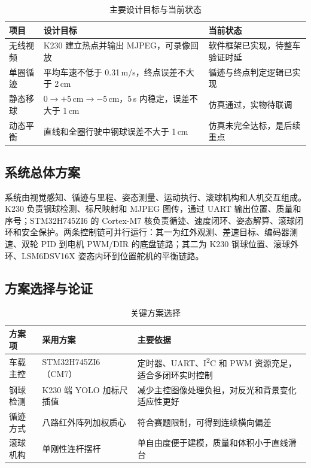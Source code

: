 \documentclass[UTF8,a4paper,12pt]{ctexart}
\begin{document}
\begin{table}[H]
  \centering
  \caption{主要设计目标与当前状态}
  \label{tab:targets}
  \begin{tabularx}{\textwidth}{>{\raggedright\arraybackslash}p{}X>{\raggedright\arraybackslash}p{}}
    \toprule
    项目 & 设计目标 & 当前状态 \\
    \midrule
    无线视频 & K230 建立热点并输出 MJPEG，可录像回放 & 软件框架已实现，待整车验证时延 \\
    单圈循迹 & 平均车速不低于 0.31\,m/s，终点误差不大于 2\,cm & 循迹与终点判定逻辑已实现 \\
    静态移球 & $0\rightarrow+5\,\mathrm{cm}\rightarrow-5\,\mathrm{cm}$，5\,s 内稳定，误差不大于 1\,cm & 仿真通过，实物待联调 \\
    动态平衡 & 直线和全圈行驶中钢球误差不大于 1\,cm & 仿真未完全达标，是后续重点 \\
    \bottomrule
  \end{tabularx}
\end{table}

\subsection{系统总体方案}

系统由视觉感知、循迹与里程、姿态测量、运动执行、滚球机构和人机交互组成。K230 负责钢球检测、标尺映射和 MJPEG 图传，通过 UART 输出位置、质量和序号；STM32H745ZI6 的 Cortex-M7 核负责循迹、速度闭环、姿态解算、滚球闭环和安全保护。两条控制链可并行运行：其一为红外观测、差速目标、编码器测速、双轮 PID 到电机 PWM/DIR 的底盘链路；其二为 K230 钢球位置、滚球外环、LSM6DSV16X 姿态内环到位置舵机的平衡链路。

\subsection{方案选择与论证}

\begin{table}[H]
  \centering
  \caption{关键方案选择}
  \label{tab:choices}
  \begin{tabularx}{\textwidth}{>{\raggedright\arraybackslash}p{}>{\raggedright\arraybackslash}p{}X}
    \toprule
    方案项 & 采用方案 & 主要依据 \\
    \midrule
    车载主控 & STM32H745ZI6（CM7） & 定时器、UART、I\textsuperscript{2}C 和 PWM 资源充足，适合多闭环实时控制 \\
    钢球检测 & K230 端 YOLO 加标尺插值 & 减少主控图像处理负担，对反光和背景变化适应性更好 \\
    循迹方式 & 八路红外阵列加权质心 & 符合赛题限制，可得到连续横向偏差 \\
    滚球机构 & 单刚性连杆摆杆 & 单自由度便于建模，质量和体积小于直线滑台 \\
    \bottomrule
  \end{tabularx}
\end{table}
\end{document}
